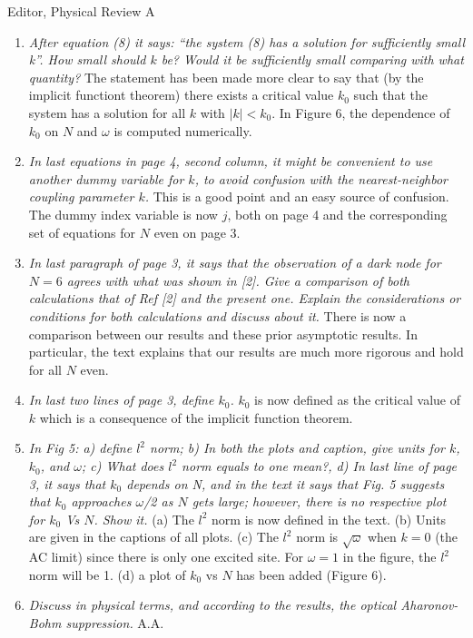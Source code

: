 \documentclass[11pt]{letter}
\begin{document}
\begin{letter}{Editor, Physical Review A}
\begin{enumerate}
\item \emph{After equation (8) it says: ``the system (8) has a solution for sufficiently small k''. How small should $k$ be? Would it be sufficiently small comparing with what quantity?} The statement has been made more clear to say that (by the implicit functiont theorem) there exists a critical value $k_0$ such that the system has a solution for all $k$ with $|k| < k_0$. In Figure 6, the dependence of $k_0$ on $N$ and $\omega$ is computed numerically.

\item \emph{In last equations in page 4, second column, it might be convenient to use another dummy variable for $k$, to avoid confusion with the nearest-neighbor coupling parameter $k$.} This is a good point and an easy source of confusion. The dummy index variable is now $j$, both on page 4 and the corresponding set of equations for $N$ even on page 3.

\item \emph{In last paragraph of page 3, it says that the observation of a dark node for $N=6$ agrees with what was shown in [2]. Give a comparison of both calculations that of Ref [2] and the present one. Explain the considerations or conditions for both calculations and discuss about it.} There is now a comparison between our results and these prior asymptotic results. In particular, the text explains that our results are much more rigorous and hold for all $N$ even.

\item \emph{In last two lines of page 3, define $k_0$.} $k_0$ is now defined as the critical value of $k$ which is a consequence of the implicit function theorem.

\item \emph{In Fig 5: a) define $l^2$ norm; b) In both the plots and caption, give units for $k$, $k_0$, and $\omega$; c) What does $l^2$ norm equals to one mean?, d) In last line of page 3, it says that $k_0$ depends on N, and in the text it says that Fig. 5 suggests that $k_0$ approaches $\omega$/2 as $N$ gets large; however, there is no respective plot for $k_0$ Vs $N$. Show it.} (a) The $l^2$ norm is now defined in the text. (b) Units are given in the captions of all plots. (c) The $l^2$ norm is $\sqrt{\omega}$ when $k = 0$ (the AC limit) since there is only one excited site. For $\omega = 1$ in the figure, the $l^2$ norm will be 1. (d) a plot of $k_0$ vs $N$ has been added (Figure 6).

\item \emph{Discuss in physical terms, and according to the results, the optical Aharonov-Bohm suppression.} A.A.


\end{enumerate}
\end{letter}
\end{document}

